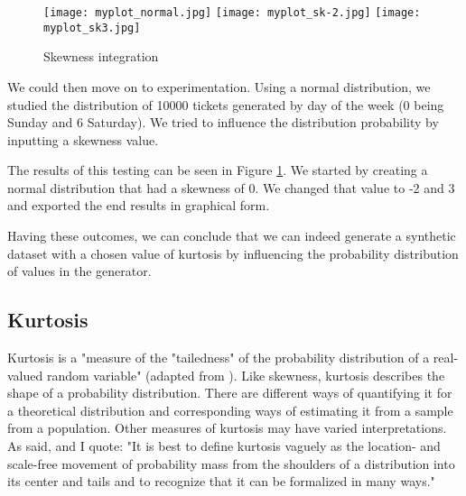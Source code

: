 \begin{figure}[!ht]
    \centering
    \texttt{[image: myplot\_normal.jpg]}
    \texttt{[image: myplot\_sk-2.jpg]}
    \texttt{[image: myplot\_sk3.jpg]}
    \caption{Skewness integration}
    \label{fig:skew-int}
\end{figure}

We could then move on to experimentation. Using a normal distribution, we studied the distribution of 10000 tickets generated by day of the week (0 being Sunday and 6 Saturday). We tried to influence the distribution probability by inputting a skewness value.

The results of this testing can be seen in Figure \ref{fig:skew-int}. We started by creating a normal distribution that had a skewness of 0. We changed that value to -2 and 3 and exported the end results in graphical form.

Having these outcomes, we can conclude that we can indeed generate a synthetic dataset with a chosen value of kurtosis by influencing the probability distribution of values in the generator.





\subsection{Kurtosis}

Kurtosis is a "measure of the "tailedness" of the probability distribution of a real-valued random variable" (adapted from \cite{ramya2017breast}). Like skewness, kurtosis describes the shape of a probability distribution. There are different ways of quantifying it for a theoretical distribution and corresponding ways of estimating it from a sample from a population. Other measures of kurtosis may have varied interpretations. As \cite{doi:10.1080/00031305.1988.10475539} said, and I quote: "It is best to define kurtosis vaguely as the location- and scale-free movement of probability mass from the shoulders of a distribution into its center and tails and to recognize that it can be formalized in many ways."

